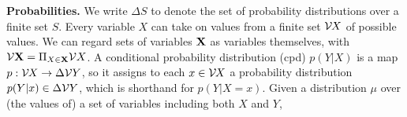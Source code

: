 \documentclass[twoside]{article}
\begin{document}
    \textbf{Probabilities.}
We write $\Delta S$ to denote the set of probability distributions over a finite set $S$.
Every variable $X$ can take on values from a finite set $\mathcal V\mskip-1.5mu X$ of possible values.
We can regard sets of variables $\mathbf{X}$ as variables themselves, with
$\mathcal V \mathbf{X} = \Pi_{X \in \mathbf{X}} \mathcal V X$.
A conditional probability distribution (cpd) $p(Y|X)$ is a map
$p : \mathcal V\mskip-1.5mu  X \to \Delta \mathcal V Y$, so it assigns to each $x \in \mathcal V\mskip-1.5mu X$ a
probability distribution $p(Y|x) \in \Delta \mathcal V Y$, which is shorthand for $p(Y|X\!\!=\!x)$.
Given a distribution $\mu$ over (the values of) a set of variables including both $X$ and $Y$,
\end{document}

